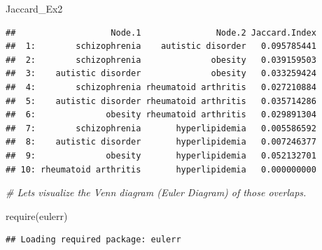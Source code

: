\documentclass[
]{book}
\newenvironment{Shaded}{\begin{snugshade}}{\end{snugshade}}
\newcommand{\CommentTok}[1]{\textcolor[rgb]{0.56,0.35,0.01}{\textit{#1}}}
\newcommand{\FunctionTok}[1]{\textcolor[rgb]{0.00,0.00,0.00}{#1}}
\newcommand{\NormalTok}[1]{#1}
\begin{document}
\begin{Shaded}
\begin{Highlighting}[]
\NormalTok{Jaccard\_Ex2}
\end{Highlighting}
\end{Shaded}

\begin{verbatim}
##                   Node.1               Node.2 Jaccard.Index
##  1:        schizophrenia    autistic disorder   0.095785441
##  2:        schizophrenia              obesity   0.039159503
##  3:    autistic disorder              obesity   0.033259424
##  4:        schizophrenia rheumatoid arthritis   0.027210884
##  5:    autistic disorder rheumatoid arthritis   0.035714286
##  6:              obesity rheumatoid arthritis   0.029891304
##  7:        schizophrenia       hyperlipidemia   0.005586592
##  8:    autistic disorder       hyperlipidemia   0.007246377
##  9:              obesity       hyperlipidemia   0.052132701
## 10: rheumatoid arthritis       hyperlipidemia   0.000000000
\end{verbatim}

\begin{Shaded}
\begin{Highlighting}[]
\CommentTok{\# Let\textquotesingle{}s visualize the Venn diagram (Euler Diagram) of those overlaps. }

\FunctionTok{require}\NormalTok{(eulerr)}
\end{Highlighting}
\end{Shaded}

\begin{verbatim}
## Loading required package: eulerr
\end{verbatim}
\end{document}
